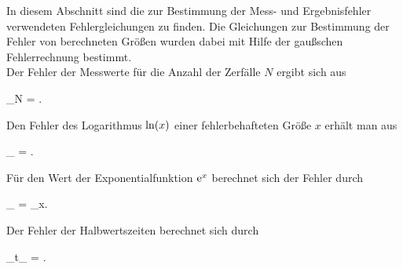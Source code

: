 In diesem Abschnitt sind die zur Bestimmung der Mess- und Ergebnisfehler verwendeten
Fehlergleichungen zu finden. Die Gleichungen zur Bestimmung der Fehler von berechneten
Größen wurden dabei mit Hilfe der gaußschen Fehlerrechnung bestimmt. \\

Der Fehler der Messwerte für die Anzahl der Zerfälle $N$ ergibt sich  aus
\begin{errorEquation}
	\sigma_{N} = .
	\label{std:Abweichung Messwerte}
\end{errorEquation}


Den Fehler des Logarithmus  $\Ln{x}$ einer fehlerbehafteten Größe $x$ erhält man aus
\begin{errorEquation}
	 \sigma_{\ln} = . 
	 \label{std:ln}
\end{errorEquation}


Für den Wert der Exponentialfunktion $\mathrm{e}^{x}$ berechnet sich der Fehler durch
\begin{errorEquation}
	 \sigma_{\exp} =  \cdot \sigma_{x}. 
	 \label{std:Exp}
\end{errorEquation}
 
 
 Der Fehler der Halbwertszeiten berechnet sich durch
 \begin{errorEquation}
 	 \sigma_{t_{}} = . 
 	 \label{std:Halbwertszeit}
 \end{errorEquation}